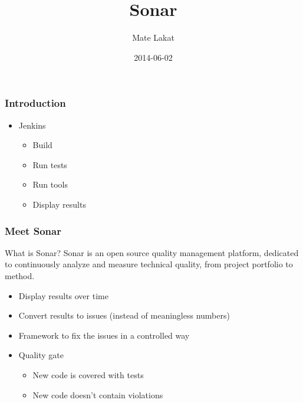 \documentclass{beamer}
\title{Sonar}
\author{Mate Lakat}
\date{2014-06-02}
\begin{document}
\begin{frame}
    \titlepage
\end{frame}

\begin{frame}
    \frametitle{Introduction}
    \begin{itemize}
        \item Jenkins
        \pause
        \begin{itemize}
            \item Build
            \pause
            \item Run tests
            \pause
            \item Run tools
            \pause
            \item Display results
            \pause
        \end{itemize}
    \end{itemize}

\end{frame}

\begin{frame}
    \frametitle{Meet Sonar}
    \begin{block}{What is Sonar?}
    Sonar is an open source quality management platform, dedicated to
    continuously analyze and measure technical quality, from project portfolio
    to method.
    \end{block}

    \pause
    \begin{itemize}
        \item Display results over time
        \pause
        \item Convert results to issues (instead of meaningless numbers)
        \pause
        \item Framework to fix the issues in a controlled way
        \pause
        \item Quality gate
            \pause
            \begin{itemize}
                \item New code is covered with tests
                \item New code doesn't contain violations
            \end{itemize}
    \end{itemize}
\end{frame}
\end{document}
